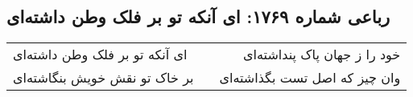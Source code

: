 \begin{center}
\section*{رباعی شماره ۱۷۶۹: ای آنکه تو بر فلک وطن داشته‌ای}
\label{sec:1769}
\begin{longtable}{l p{0.5cm} r}
ای آنکه تو بر فلک وطن داشته‌ای
&&
خود را ز جهان پاک پنداشته‌ای
\\
بر خاک تو نقش خویش بنگاشته‌ای
&&
وان چیز که اصل تست بگذاشته‌ای
\\
\end{longtable}
\end{center}
